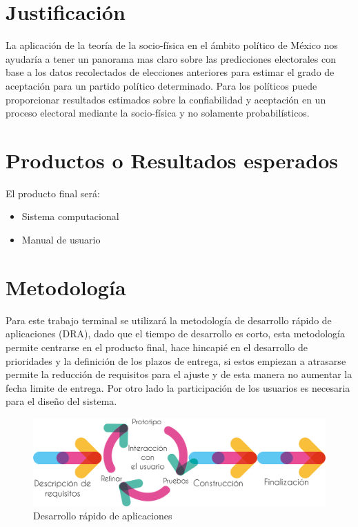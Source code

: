 \documentclass[letterpaper, 10pt]{article}
\begin{document}
\section{Justificación}

La aplicación de la teoría de la socio-física en el ámbito político de México nos ayudaría a tener un panorama mas claro sobre las predicciones electorales con base a los datos recolectados de elecciones anteriores para estimar el grado de aceptación para un partido político determinado.
\newline
\newline
Para los políticos puede proporcionar resultados estimados sobre la confiabilidad y aceptación en un proceso electoral mediante la socio-física y no solamente probabilísticos.

\section{Productos o Resultados esperados}
El producto final será:
\begin{itemize}
    \item Sistema computacional
    \item Manual de usuario
\end{itemize}

\section{Metodología}

Para este trabajo terminal se utilizará la metodología de desarrollo rápido de aplicaciones (DRA), dado que el tiempo de desarrollo es corto, esta metodología permite centrarse en el producto final, hace hincapié en el desarrollo de prioridades y la definición de los plazos de entrega, si estos empiezan a atrasarse permite la reducción de requisitos para el ajuste y de esta manera no aumentar la fecha limite de entrega. Por otro lado la participación de los usuarios es necesaria para el diseño del sistema.\cite{dra}
\begin{figure}[!ht]
    \centering
    \includegraphics[scale=0.50]{Protocolo/images/4x/RAD@4x.png}
    \caption{Desarrollo rápido de aplicaciones}
    \label{graphic:PRecordatorio}
\end{figure}
\end{document}
